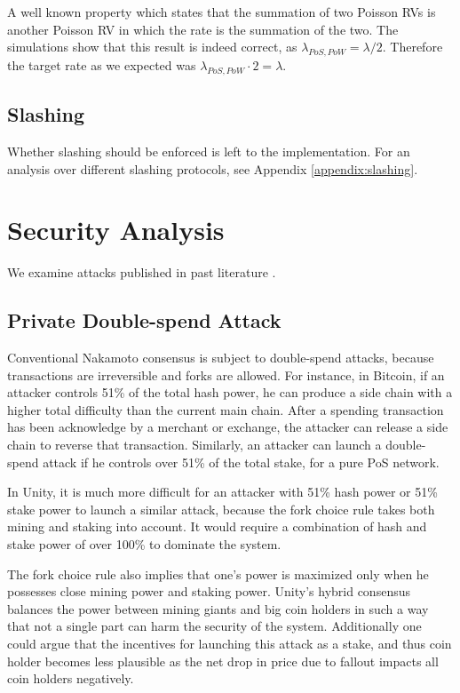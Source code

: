 \documentclass[a4paper]{article}
\begin{document}
A well known property which states that the summation of two Poisson RVs is another Poisson RV in which the rate is the summation of the two. The simulations show that this result is indeed correct, as $\lambda_{PoS,PoW}=\lambda/2$. Therefore the target rate as we expected was $\lambda_{PoS,PoW} \cdot 2 = \lambda$.

\subsection{Slashing}

Whether slashing should be enforced is left to the implementation. For an analysis over different slashing protocols, see Appendix \ref{appendix:slashing}.

\section{Security Analysis}

We examine attacks published in past literature \cite{buterin_randomness}\cite{ouroboros}.

\subsection{Private Double-spend Attack}

Conventional Nakamoto consensus is subject to double-spend attacks, because transactions are irreversible and forks are allowed. For instance, in Bitcoin, if an attacker controls 51\% of the total hash power, he can produce a side chain with a higher total difficulty than the current main chain. After a spending transaction has been acknowledge by a merchant or exchange, the attacker can release a side chain to reverse that transaction. Similarly, an attacker can launch a double-spend attack if he controls over 51\% of the total stake, for a pure PoS network.

In Unity, it is much more difficult for an attacker with 51\% hash power or 51\% stake power to launch a similar attack, because the fork choice rule takes both mining and staking into account. It would require a combination of hash and stake power of over 100\% to dominate the system.

The fork choice rule also implies that one's power is maximized only when he possesses close mining power and staking power. Unity's hybrid consensus balances the power between mining giants and big coin holders in such a way that not a single part can harm the security of the system. Additionally one could argue that the incentives for launching this attack as a stake, and thus coin holder becomes less plausible as the net drop in price due to fallout impacts all coin holders negatively.
\end{document}
